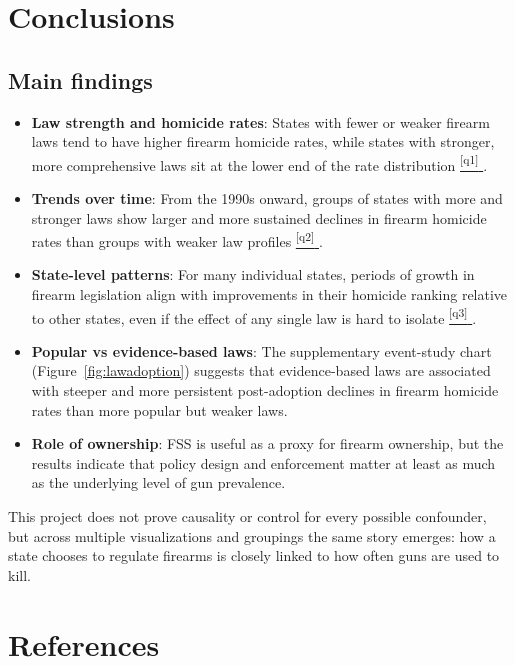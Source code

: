 \documentclass[a4paper,11pt]{article}
\newcommand*{\sref}[1]{%
  \hyperref[{#1}]{%
    \color{accent}\textsuperscript{\ref*{#1}}%
  }%
}
\begin{document}
\section{Conclusions}

\subsection*{Main findings}

\begin{itemize}
	\item \textbf{Law strength and homicide rates}: States with fewer or weaker
	      firearm laws tend to have higher firearm homicide rates, while states
	      with stronger, more comprehensive laws sit at the lower end of the rate
	      distribution\sref{q1}.
	\item \textbf{Trends over time}: From the 1990s onward, groups of states with
	      more and stronger laws show larger and more sustained declines in
	      firearm homicide rates than groups with weaker law profiles\sref{q2}.
	\item \textbf{State-level patterns}: For many individual states, periods of
	      growth in firearm legislation align with improvements in their
	      homicide ranking relative to other states, even if the effect of any
	      single law is hard to isolate\sref{q3}.
	\item \textbf{Popular vs evidence-based laws}: The supplementary event-study
	      chart (Figure~\ref{fig:lawadoption}) suggests that evidence-based laws
	      are associated with steeper and more persistent post-adoption declines
	      in firearm homicide rates than more popular but weaker laws.
	\item \textbf{Role of ownership}: FSS is useful as a proxy for firearm
	      ownership, but the results indicate that policy design and enforcement
	      matter at least as much as the underlying level of gun prevalence.
\end{itemize}

\par
This project does not prove causality or control for every possible
confounder, but across multiple visualizations and groupings the same story
emerges: how a state chooses to regulate firearms is closely linked to how
often guns are used to kill.

\newpage

\section{References}
\printbibliography[heading=none]
\end{document}
